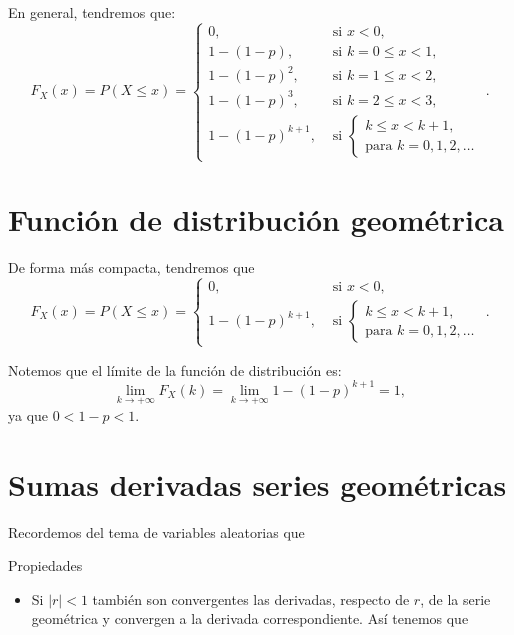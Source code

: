 \documentclass[
  letterpaper,
  DIV=11,
  numbers=noendperiod]{scrreprt}
\providecommand{\tightlist}{%
  \setlength{\itemsep}{0pt}\setlength{\parskip}{0pt}}\usepackage{longtable,booktabs,array}
\begin{document}
En general, tendremos que: \[
F_X(x)=P(X\leq x)=
\left\{\begin{array}{ll} 
0, & \mbox{ si } x<0,\\
1- (1-p),  & \mbox{ si } k=0\leq x <1,\\
1- (1-p)^2, & \mbox{ si } k=1\leq x <2,\\
1- (1-p)^3, & \mbox{ si } k=2\leq x <3,\\
1- (1-p)^{k+1}, & \mbox{ si } \left\{ \begin{array}{l}k\leq x< k+1,\\\mbox{para } k=0,1,2,\ldots\end{array}
    \right.
\end{array}
\right..
\]

\section{Función de distribución
geométrica}\label{funciuxf3n-de-distribuciuxf3n-geomuxe9trica-3}

De forma más compacta, tendremos que \[
F_X(x)=P(X\leq x)=
\left\{\begin{array}{ll} 
0, & \mbox{ si } x<0,\\
1- (1-p)^{k+1}, & \mbox{ si } \left\{ \begin{array}{l}k\leq x< k+1,\\\mbox{para } k=0,1,2,\ldots\end{array}
\right.
\end{array}
\right..
\]

Notemos que el límite de la función de distribución es: \[
\displaystyle\lim_{k\to +\infty } F_X(k)=\lim_{k\to +\infty } 1-(1-p)^{k+1}=
1,
\] ya que \(0<1-p<1\).

\section{Sumas derivadas series
geométricas}\label{sumas-derivadas-series-geomuxe9tricas}

Recordemos del tema de variables aleatorias que

Propiedades

\begin{itemize}
\tightlist
\item
  Si \(|r|<1\) también son convergentes las derivadas, respecto de
  \(r\), de la serie geométrica y convergen a la derivada
  correspondiente. Así tenemos que
\end{itemize}
\end{document}
